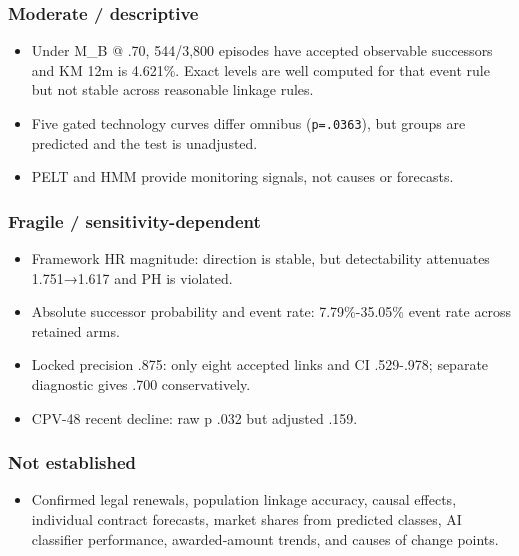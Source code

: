 \subsubsection{Moderate / descriptive}\label{moderate--descriptive}

\begin{itemize}
\tightlist
\item
  Under M\_B @ .70, 544/3,800 episodes have accepted observable
  successors and KM 12m is 4.621\%. Exact levels are well computed for
  that event rule but not stable across reasonable linkage rules.
\item
  Five gated technology curves differ omnibus (\texttt{p=.0363}), but
  groups are predicted and the test is unadjusted.
\item
  PELT and HMM provide monitoring signals, not causes or forecasts.
\end{itemize}

\subsubsection{Fragile /
sensitivity-dependent}\label{fragile--sensitivity-dependent}

\begin{itemize}
\tightlist
\item
  Framework HR magnitude: direction is stable, but detectability
  attenuates 1.751→1.617 and PH is violated.
\item
  Absolute successor probability and event rate: 7.79\%-35.05\% event
  rate across retained arms.
\item
  Locked precision .875: only eight accepted links and CI .529-.978;
  separate diagnostic gives .700 conservatively.
\item
  CPV-48 recent decline: raw p .032 but adjusted .159.
\end{itemize}

\subsubsection{Not established}\label{not-established}

\begin{itemize}
\tightlist
\item
  Confirmed legal renewals, population linkage accuracy, causal effects,
  individual contract forecasts, market shares from predicted classes,
  AI classifier performance, awarded-amount trends, and causes of change
  points.
\end{itemize}

